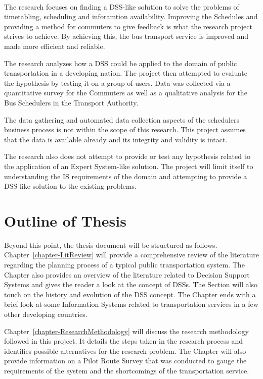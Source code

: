 \documentclass[12pt, oneside]{report}
\begin{document}
\paragraph{ } The research focuses on finding a DSS-like solution to solve the problems of timetabling, scheduling and inforamtion availability. Improving the Schedules and providing a method for commuters to give feedback is what the research project strives to achieve. By achieving this, the bus transport service is improved and made more efficient and reliable. 

The research analyzes how a DSS could be applied to the domain of public transportation in a developing nation. The project then attempted to evaluate the hypothesis by testing it on a group of users. Data was collected via a quantitative survey for the Commuters as well as a qualitative analysis for the Bus Schedulers in the Transport Authority.

The data gathering and automated data collection aspects of the schedulers business process is not within the scope of this research. This project assumes that the data is available already and its integrity and validity is intact.

The research also does not attempt to provide or test any hypothesis related to the application of an Expert System-like solution. The project will limit itself to understanding the IS requirements of the domain and attempting to provide a DSS-like solution to the existing problems.

\newpage

\section{Outline of Thesis}
\label{section-OutlineOfThesis}

Beyond this point, the thesis document will be structured as follows. Chapter~\ref{chapter-LitReview} will provide a comprehensive review of the literature regarding the planning process of a typical public transportation system. The Chapter also provides an overview of the literature related to Decision Support Systems and gives the reader a look at the concept of DSSs. The Section will also touch on the history and evolution of the DSS concept. The Chapter ends with a brief look at some Information Systems related to transportation services in a few other developing countries.

Chapter~\ref{chapter-ResearchMethodology} will discuss the research methodology followed in this project. It details the steps taken in the research process and identifies possible alternatives for the research problem. The Chapter will also provide information on a Pilot Route Survey that was conducted to gauge the requirements of the system and the shortcomings of the transportation service.
\end{document}
